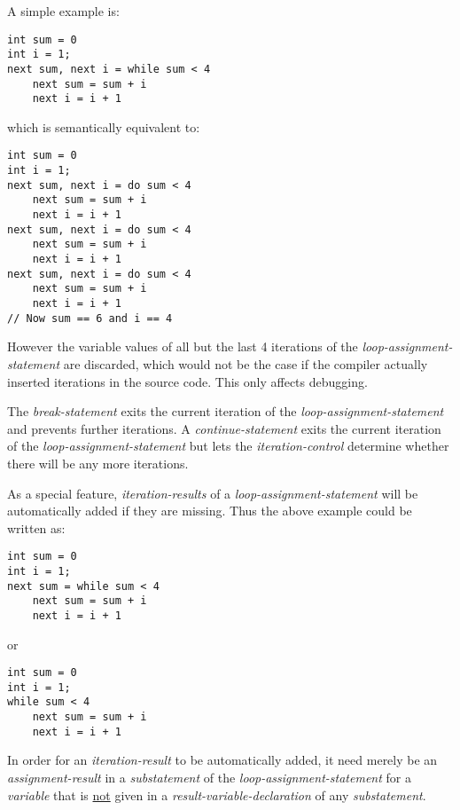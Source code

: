 \documentclass[12pt]{article}
\newenvironment{indpar}[1][0.3in]%
	{\begin{list}{}%
		     {\setlength{\itemsep}{0in}%
		      \setlength{\topsep}{0in}%
		      \setlength{\parsep}{1ex}%
		      \setlength{\labelwidth}{#1}%
		      \setlength{\leftmargin}{#1}%
		      \addtolength{\leftmargin}{\labelsep}}%
	 \item}%
	{\end{list}}
\begin{document}
A simple example is:
\begin{indpar}\begin{verbatim}
int sum = 0
int i = 1;
next sum, next i = while sum < 4
    next sum = sum + i
    next i = i + 1
\end{verbatim}\end{indpar}
which is semantically equivalent to:
\begin{indpar}\begin{verbatim}
int sum = 0
int i = 1;
next sum, next i = do sum < 4
    next sum = sum + i
    next i = i + 1
next sum, next i = do sum < 4
    next sum = sum + i
    next i = i + 1
next sum, next i = do sum < 4
    next sum = sum + i
    next i = i + 1
// Now sum == 6 and i == 4
\end{verbatim}\end{indpar}

However the variable values of all but the
last 4 iterations of the {\em loop-assignment-statement}
are discarded, which would not be the case if the compiler
actually inserted iterations in the source code. 
This only affects debugging.

The {\em break-statement} exits the current iteration of the
{\em loop-assignment-statement} and prevents further iterations.
A {\em continue-statement} exits the current iteration of the
{\em loop-assignment-statement} but lets the
{\em iteration-control} determine whether there will be any
more iterations.

As a special feature, {\em iteration-results} of a
{\em loop-assignment-statement} will be automatically
added if they are missing.  Thus the above example
could be written as:
\begin{indpar}\begin{verbatim}
int sum = 0
int i = 1;
next sum = while sum < 4
    next sum = sum + i
    next i = i + 1
\end{verbatim}\end{indpar}
or
\begin{indpar}\begin{verbatim}
int sum = 0
int i = 1;
while sum < 4
    next sum = sum + i
    next i = i + 1
\end{verbatim}\end{indpar}
In order for an {\em iteration-result} to be automatically
added, it need merely be an {\em assignment-result} in a
{\em substatement} of the {\em loop-assignment-statement}
for a {\em variable} that is \underline{not} given in a
{\em result-variable-declaration} of any {\em substatement}.
\end{document}
